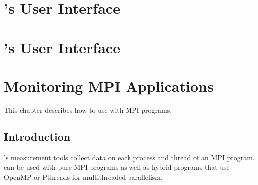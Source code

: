 \documentclass[11pt,letterpaper]{report}
\begin{document}





\chapter{\hpcviewer{}'s User Interface}
\label{chpt:hpcviewer-interface}





\chapter{\hpctraceviewer{}'s User Interface}
\label{chpt:hpcviewer-interface}





\chapter{Monitoring MPI Applications}
\label{chpt:mpi-apps}

This chapter describes how to use \HPCToolkit{} with MPI programs.


\section{Introduction}

\HPCToolkit{}'s measurement tools collect data on each process and thread of an MPI program.
\HPCToolkit{} can be used with pure MPI programs as well as hybrid programs that use OpenMP or Pthreads for multithreaded parallelism.
\end{document}
